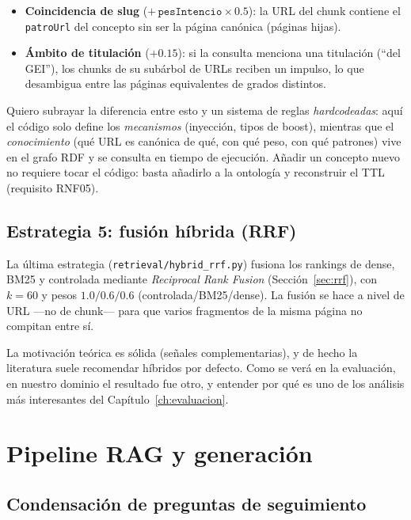 \documentclass[12pt, a4paper, twoside]{report}
\begin{document}
\begin{enumerate}
\begin{itemize}
    \item \textbf{Coincidencia de slug} ($+\,\texttt{pesIntencio} \times 0.5$): la URL del chunk contiene el \texttt{patroUrl} del concepto sin ser la p\'agina can\'onica (p\'aginas hijas).
    \item \textbf{\'Ambito de titulaci\'on} ($+0.15$): si la consulta menciona una titulaci\'on (``del GEI''), los chunks de su sub\'arbol de URLs reciben un impulso, lo que desambigua entre las p\'aginas equivalentes de grados distintos.
  \end{itemize}
\end{enumerate}

Quiero subrayar la diferencia entre esto y un sistema de reglas \textit{hardcodeadas}: aqu\'i el c\'odigo solo define los \textit{mecanismos} (inyecci\'on, tipos de boost), mientras que el \textit{conocimiento} (qu\'e URL es can\'onica de qu\'e, con qu\'e peso, con qu\'e patrones) vive en el grafo RDF y se consulta en tiempo de ejecuci\'on. A\~nadir un concepto nuevo no requiere tocar el c\'odigo: basta a\~nadirlo a la ontolog\'ia y reconstruir el TTL (requisito RNF05).

\subsection{Estrategia 5: fusi\'on h\'ibrida (RRF)}
\label{sec:hybrid-impl}

La \'ultima estrategia (\texttt{retrieval/hybrid\_rrf.py}) fusiona los rankings de dense, BM25 y controlada mediante \textit{Reciprocal Rank Fusion} (Secci\'on~\ref{sec:rrf}), con $k=60$ y pesos $1.0/0.6/0.6$ (controlada/BM25/dense). La fusi\'on se hace a nivel de URL ---no de chunk--- para que varios fragmentos de la misma p\'agina no compitan entre s\'i.

La motivaci\'on te\'orica es s\'olida (se\~nales complementarias), y de hecho la literatura suele recomendar h\'ibridos por defecto. Como se ver\'a en la evaluaci\'on, en nuestro dominio el resultado fue otro, y entender por qu\'e es uno de los an\'alisis m\'as interesantes del Cap\'itulo~\ref{ch:evaluacion}.

\section{Pipeline RAG y generaci\'on}

\subsection{Condensaci\'on de preguntas de seguimiento}
\end{document}
